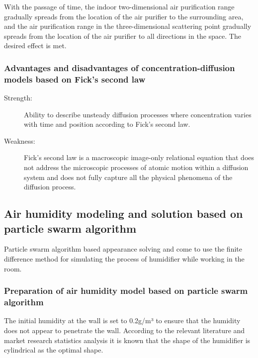 \documentclass{apmcmthesis}
\begin{document}
With the passage of time, the indoor two-dimensional air purification range gradually spreads from the location of the air purifier to the surrounding area, and the air purification range in the three-dimensional scattering point gradually spreads from the location of the air purifier to all directions in the space. The desired effect is met.

\subsubsection{Advantages and disadvantages of concentration-diffusion models based on Fick's second law}
\begin{description}
	\item[Strength:] Ability to describe unsteady diffusion processes where concentration varies with time and position according to Fick's second law.
	
	\item[Weakness:] Fick's second law is a macroscopic image-only relational equation that does not address the microscopic processes of atomic motion within a diffusion system and does not fully capture all the physical phenomena of the diffusion process.
\end{description} 

\subsection{Air humidity modeling and solution based on particle swarm algorithm}
Particle swarm algorithm based appearance solving and come to use the finite difference method for simulating the process of humidifier while working in the room.

\subsubsection{ Preparation of air humidity model based on particle swarm algorithm}

The initial humidity at the wall is set to 0.2g/m³ to ensure that the humidity does not appear to penetrate the wall. According to the relevant literature\cite{lgsteamer2024} and market research statistics analysis it is known that the shape of the humidifier is cylindrical as the optimal shape.
\end{document}
